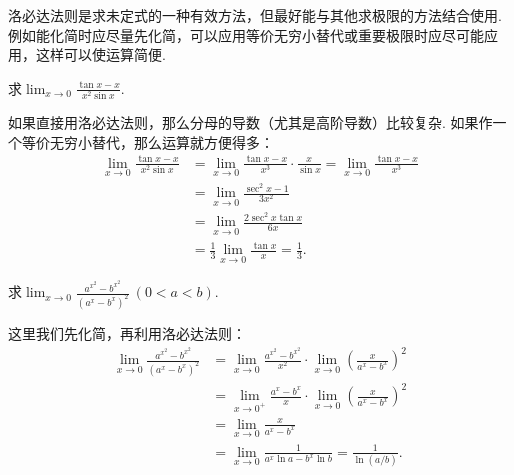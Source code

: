 洛必达法则是求未定式的一种有效方法，但最好能与其他求极限的方法结合使用.
例如能化简时应尽量先化简，可以应用等价无穷小替代或重要极限时应尽可能应用，这样可以使运算简便.

\begin{example}
求\(\lim_{x\to0} \frac{\tan x - x}{x^2 \sin x}\).
\begin{solution}
如果直接用洛必达法则，那么分母的导数（尤其是高阶导数）比较复杂.
如果作一个等价无穷小替代，那么运算就方便得多：
\begin{align*}
	\lim_{x\to0} \frac{\tan x - x}{x^2 \sin x}
	&= \lim_{x\to0} \frac{\tan x - x}{x^3} \cdot \frac{x}{\sin x}
	= \lim_{x\to0} \frac{\tan x - x}{x^3} \\
	&= \lim_{x\to0} \frac{\sec^2 x - 1}{3x^2} \\
	&= \lim_{x\to0} \frac{2\sec^2 x \tan x}{6x} \\
	&= \frac13 \lim_{x\to0} \frac{\tan x}{x} = \frac13.
\end{align*}
\end{solution}
\end{example}

\begin{example}
求\(\lim_{x\to0} \frac{a^{x^2}-b^{x^2}}{(a^x-b^x)^2}\ (0<a<b)\).
\begin{solution}
这里我们先化简，再利用洛必达法则：\begin{align*}
	\lim_{x\to0} \frac{a^{x^2}-b^{x^2}}{(a^x-b^x)^2}
	&= \lim_{x\to0} \frac{a^{x^2}-b^{x^2}}{x^2}
		\cdot \lim_{x\to0} \left(\frac{x}{a^x-b^x}\right)^2 \\
	&= \lim_{x\to0^+} \frac{a^x-b^x}{x}
		\cdot \lim_{x\to0} \left(\frac{x}{a^x-b^x}\right)^2 \\
	&= \lim_{x\to0} \frac{x}{a^x-b^x} \\
	&= \lim_{x\to0} \frac{1}{a^x \ln a - b^x \ln b}
	= \frac{1}{\ln(a/b)}.
\end{align*}
\end{solution}
\end{example}

